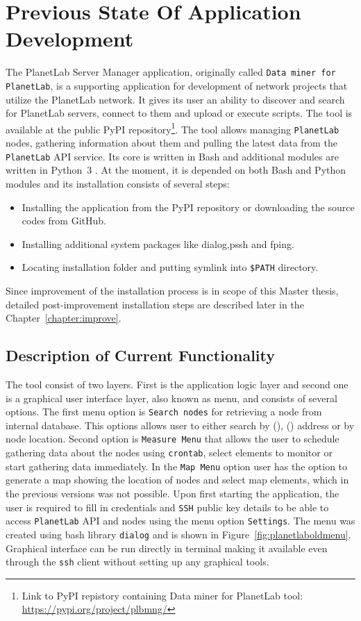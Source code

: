 \chapter{Previous State Of Application Development}
\label{chapter:plbmng}
The PlanetLab Server Manager application, originally called \texttt{Data miner for PlanetLab}, is a supporting application for development of network projects that utilize the PlanetLab network. It gives its user an ability to discover and search for PlanetLab servers, connect to them and upload or execute scripts. The tool is available at the public PyPI repository\footnote{Link to PyPI repistory containing Data miner for PlanetLab tool: \url{https://pypi.org/project/plbmng/}}. The tool allows managing \texttt{PlanetLab} nodes, gathering information about them and pulling the latest data from the \texttt{PlanetLab} API service. Its core is written in Bash and additional modules are written in Python~3 \cite{suba1}. At the moment, it is depended on both Bash and Python modules and its installation consists of several steps:
\begin{itemize}
	\item Installing the application from the PyPI repository or downloading the source codes from GitHub.
	\item Installing additional system packages like dialog,pssh and fping.
	\item Locating installation folder and putting symlink into \texttt{\$PATH} directory.
\end{itemize}
Since improvement of the installation process is in scope of this Master thesis, detailed post-improvement installation steps are described later in the Chapter~\ref{chapter:improve}.
\section{Description of Current Functionality}
The tool consist of two layers. First is the application logic layer and second one is a graphical user interface layer, also known as menu, and consists of several options. The first menu option is \texttt{Search nodes} for retrieving a node from internal database. This options allows user to either search by  (),  () address or by node location. Second option is \texttt{Measure Menu} that allows the user to schedule gathering data about the nodes using \texttt{crontab}, select elements to monitor or start gathering data immediately. In the \texttt{Map Menu} option user has the option to generate a map showing the location of nodes and select map elements, which in the previous versions was not possible. Upon first starting the application, the user is required to fill in credentials and \texttt{SSH} public key details to be able to access \texttt{PlanetLab} API and nodes using the menu option \texttt{Settings}. The menu was created using bash library \texttt{dialog} and is shown in Figure~\ref{fig:planetlaboldmenu}. Graphical interface can be run directly in terminal making it available even through the \texttt{ssh} client without setting up any graphical tools.

